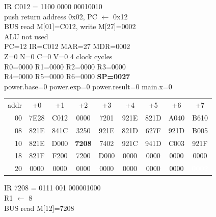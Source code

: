 \noindent\begin{tcolorbox}[stepbox, title={Step 2 \hfill PC 01 \quad CALL main}]
\textcolor{dim}{IR} C012 = 1100 0000 00010010\\
push return address 0x02, PC $\leftarrow$ 0x12\\
\textcolor{dim}{BUS} read M[01]=C012, \textcolor{wrt}{write M[27]=0002}\\
\textcolor{dim}{ALU} \textcolor{dim}{not used}\\
PC=12 IR=C012 MAR=27 MDR=0002\\
Z=0 N=0 C=0 V=0 \hfill \textcolor{dim}{4 clock cycles}\\
R0=0000 R1=0000 R2=0000 R3=0000\\
R4=0000 R5=0000 R6=0000 \textcolor{wrt}{\textbf{SP=0027}}\\
\textcolor{dim}{power.base=0  power.exp=0  power.result=0  main.x=0}\\[1pt]
{\setlength{\tabcolsep}{1.6pt}\begin{tabular}{@{}r*{8}{c}@{}}
\textcolor{dim}{addr} & \textcolor{dim}{+0} & \textcolor{dim}{+1} & \textcolor{dim}{+2} & \textcolor{dim}{+3} & \textcolor{dim}{+4} & \textcolor{dim}{+5} & \textcolor{dim}{+6} & \textcolor{dim}{+7}\\
\textcolor{dim}{00} & 7E28 & C012 & 0000 & 7201 & 921E & 821D & A040 & B610\\
\textcolor{dim}{08} & 821E & 841C & 3250 & 921E & 821D & 627F & 921D & B005\\
\textcolor{dim}{10} & 821E & D000 & \cellcolor{pcc}\textbf{7208} & 7402 & 921C & 941D & C003 & 921F\\
\textcolor{dim}{18} & 821F & F200 & 7200 & D000 & \cellcolor{datac}0000 & \cellcolor{datac}0000 & \cellcolor{datac}0000 & \cellcolor{datac}0000\\
\textcolor{dim}{20} & \cellcolor{stackc}0000 & \cellcolor{stackc}0000 & \cellcolor{stackc}0000 & \cellcolor{stackc}0000 & \cellcolor{stackc}0000 & \cellcolor{stackc}0000 & \cellcolor{stackc}0000 & \cellcolor{wrt}\textcolor{white}{\textbf{0002}}\\
\end{tabular}}
\end{tcolorbox}\hfill\begin{tcolorbox}[stepbox, title={Step 3 \hfill PC 12 \quad LI R1, 8}]
\textcolor{dim}{IR} 7208 = 0111 001 000001000\\
R1 $\leftarrow$ 8\\
\textcolor{dim}{BUS} read M[12]=7208\\

\end{tcolorbox}

